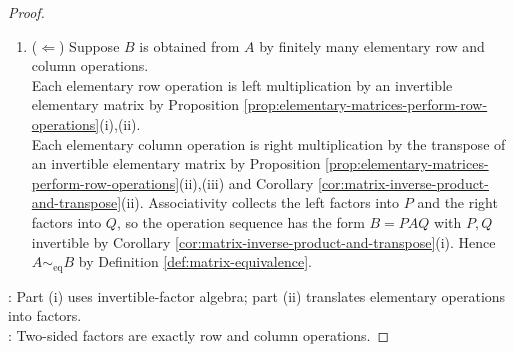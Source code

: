 \begin{proposition}
\begin{proof}
\begin{enumerate}[label=(\roman*)]
The matrix $Q^t$ is invertible by Corollary \ref{cor:matrix-inverse-product-and-transpose}(ii). The matrices $P$ and $Q^t$ are products of elementary matrices by Lemma \ref{lem:invertible-matrices-row-reduce-to-identity}(ii) and Proposition \ref{prop:elementary-matrices-perform-row-operations}(ii). Hence left multiplication by the factors of $P$ performs elementary row operations, while right multiplication by the transposes of the factors of $Q^t$ performs elementary column operations by Proposition \ref{prop:elementary-matrices-perform-row-operations}(i),(iii).\\
Thus these operations transform $A$ into $PAQ=B$.
\item[$(ii)$] ($\Leftarrow$) Suppose $B$ is obtained from $A$ by finitely many elementary row and column operations.\\
Each elementary row operation is left multiplication by an invertible elementary matrix by Proposition \ref{prop:elementary-matrices-perform-row-operations}(i),(ii).\\
Each elementary column operation is right multiplication by the transpose of an invertible elementary matrix by Proposition \ref{prop:elementary-matrices-perform-row-operations}(ii),(iii) and Corollary \ref{cor:matrix-inverse-product-and-transpose}(ii). Associativity collects the left factors into $P$ and the right factors into $Q$, so the operation sequence has the form $B=PAQ$ with $P,Q$ invertible by Corollary \ref{cor:matrix-inverse-product-and-transpose}(i). Hence $A\sim_{\mathrm{eq}}B$ by Definition \ref{def:matrix-equivalence}.
\end{enumerate}
: Part (i) uses invertible-factor algebra; part (ii) translates elementary operations into factors.\\
: Two-sided factors are exactly row and column operations.
\end{proof}
\end{proposition}

